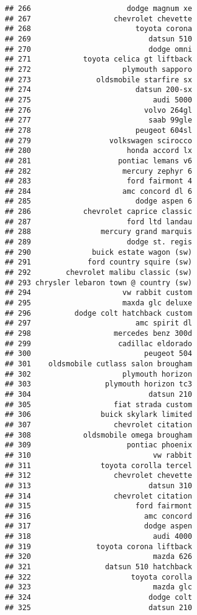 \documentclass[
]{article}
\begin{document}
\begin{verbatim}
## 266                      dodge magnum xe
## 267                   chevrolet chevette
## 268                        toyota corona
## 269                           datsun 510
## 270                           dodge omni
## 271            toyota celica gt liftback
## 272                     plymouth sapporo
## 273               oldsmobile starfire sx
## 274                        datsun 200-sx
## 275                            audi 5000
## 276                          volvo 264gl
## 277                           saab 99gle
## 278                        peugeot 604sl
## 279                  volkswagen scirocco
## 280                      honda accord lx
## 281                    pontiac lemans v6
## 282                     mercury zephyr 6
## 283                      ford fairmont 4
## 284                     amc concord dl 6
## 285                        dodge aspen 6
## 286            chevrolet caprice classic
## 287                      ford ltd landau
## 288                mercury grand marquis
## 289                      dodge st. regis
## 290              buick estate wagon (sw)
## 291             ford country squire (sw)
## 292        chevrolet malibu classic (sw)
## 293 chrysler lebaron town @ country (sw)
## 294                     vw rabbit custom
## 295                     maxda glc deluxe
## 296          dodge colt hatchback custom
## 297                        amc spirit dl
## 298                   mercedes benz 300d
## 299                    cadillac eldorado
## 300                          peugeot 504
## 301    oldsmobile cutlass salon brougham
## 302                     plymouth horizon
## 303                 plymouth horizon tc3
## 304                           datsun 210
## 305                   fiat strada custom
## 306                buick skylark limited
## 307                   chevrolet citation
## 308            oldsmobile omega brougham
## 309                      pontiac phoenix
## 310                            vw rabbit
## 311                toyota corolla tercel
## 312                   chevrolet chevette
## 313                           datsun 310
## 314                   chevrolet citation
## 315                        ford fairmont
## 316                          amc concord
## 317                          dodge aspen
## 318                            audi 4000
## 319               toyota corona liftback
## 320                            mazda 626
## 321                 datsun 510 hatchback
## 322                       toyota corolla
## 323                            mazda glc
## 324                           dodge colt
## 325                           datsun 210

\end{verbatim}
\end{document}
